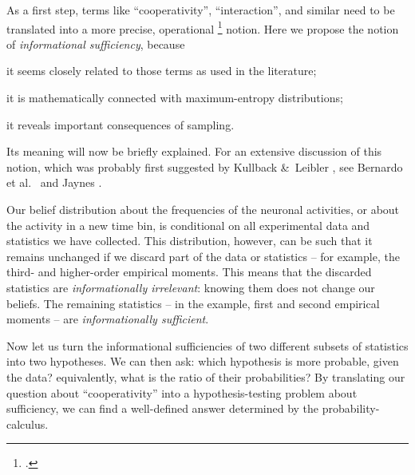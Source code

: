 \documentclass[\ifafour a4paper,12pt,\else a5paper,10pt,\fi%
onecolumn,oneside,article,%
british%
]{memoir}
\theoremstyle{remark}
\theoremstyle{innote}
\newcommand*{\citep}{\footcites}
\newcommand*{\amp}{\&}
\renewcommand*{\|}{\nonscript\,\vert\nonscript\;\mathopen{}}
\newcommand*{\sect}{\S}%
\newcommand*{\chap}{ch.}%
\newcommand*{\cf}{{cf.}}
\newcommand*{\etal}{{et al.}}
\begin{document}
\bigskip

As a first step, terms like \enquote{cooperativity}, \enquote{interaction},
and similar need to be translated into a more precise, operational
\citep[\cf][\chap~I]{bridgman1927_r1958} notion. Here we propose the notion
of \emph{informational sufficiency}, because
\begin{enumerate*}[label=(\roman*)]
\item it seems closely related to those terms as used in the
  literature; \item it is mathematically connected with maximum-entropy
  distributions; \item it reveals important consequences of sampling.
\end{enumerate*}
Its meaning will now be briefly explained. For an extensive discussion of
this notion, which was probably first suggested by Kullback \amp\ Leibler
\parencite*{kullbacketal1951}, see Bernardo \etal\
\parencite*[\sect~4.5]{bernardoetal1994} and Jaynes \parencite*[\chap~8 and
\sect~14.2]{jaynes1994_r2003}.

Our belief distribution about the frequencies of the neuronal activities,
or about the activity in a new time bin, is conditional on all experimental
data and statistics we have collected. This distribution, however, can be such that
it remains unchanged if we discard part of the data or statistics -- for
example, the third- and higher-order empirical moments. %
This means that the discarded statistics are \emph{informationally
  irrelevant}: knowing them does not change our beliefs. The remaining
statistics -- in the example, first and second empirical moments -- are
\emph{informationally sufficient}.%

Now let us turn the informational sufficiencies of two different subsets of
statistics into two hypotheses. We can then ask: which hypothesis is more
probable, given the data? equivalently, what is the ratio of their
probabilities? By translating our question about \enquote{cooperativity}
into a hypothesis-testing problem about sufficiency, we can find a
well-defined answer determined by the probability-calculus. %
\end{document}
